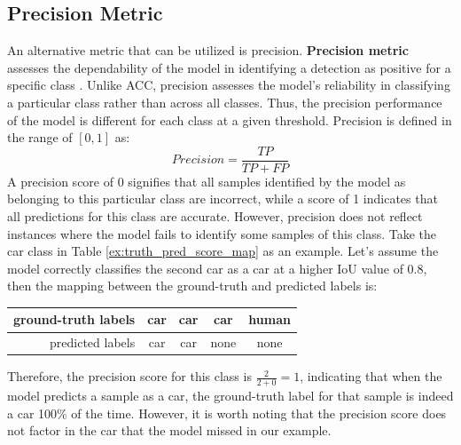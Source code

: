 \subsection{Precision Metric}  \label{subsec:precision_metric}
An alternative metric that can be utilized is precision. \textbf{Precision metric} assesses the dependability of the model in identifying a detection as positive for a specific class \cite{metrics_survey_2020}. Unlike ACC, precision assesses the model's reliability in classifying a particular class rather than across all classes. Thus, the precision performance of the model is different for each class at a given threshold. Precision is defined in the range of $[0,1]$  as:
\begin{equation}
    Precision = \frac{TP}{TP+FP} \label{eq:precision}
\end{equation}
A precision score of 0 signifies that all samples identified by the model as belonging to this particular class are incorrect, while a score of 1 indicates that all predictions for this class are accurate. However, precision does not reflect instances where the model fails to identify some samples of this class. Take the car class in Table \ref{ex:truth_pred_score_map} as an example. Let's assume the model correctly classifies the second car as a car at a higher IoU value of 0.8, then the mapping between the ground-truth and predicted labels is:
\begin{table}[H]
    \centering
    \begin{tabular}{rcccc}
    ground-truth labels         & car  & car & car  & human \\ \hline
    predicted labels            & car  & car & none & none
    \end{tabular}
\end{table}
\noindent Therefore, the precision score for this class is $\frac{2}{2+0}=1$, indicating that when the model predicts a sample as a car, the ground-truth label for that sample is indeed a car 100\% of the time. However, it is worth noting that the precision score does not factor in the car that the model missed in our example.

